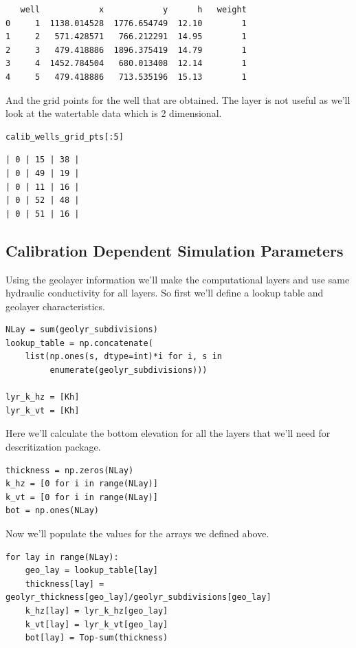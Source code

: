 \documentclass[titlepage,12pt]{unisubmission}
\begin{document}
\begin{verbatim}
   well            x            y      h   weight
0     1  1138.014528  1776.654749  12.10        1
1     2   571.428571   766.212291  14.95        1
2     3   479.418886  1896.375419  14.79        1
3     4  1452.784504   680.013408  12.14        1
4     5   479.418886   713.535196  15.13        1
\end{verbatim}

And the grid points for the well that are obtained. The layer is not useful as we'll look at the watertable data which is 2 dimensional.

\begin{verbatim}
calib_wells_grid_pts[:5]
\end{verbatim}

\begin{verbatim}
| 0 | 15 | 38 |
| 0 | 49 | 19 |
| 0 | 11 | 16 |
| 0 | 52 | 48 |
| 0 | 51 | 16 |
\end{verbatim}

\subsection{Calibration Dependent Simulation Parameters}
\label{sec:orgb977cb2}
Using the geolayer information we'll make the computational layers and use same hydraulic conductivity for all layers. So first we'll define a lookup table and geolayer characteristics.

\begin{verbatim}
NLay = sum(geolyr_subdivisions)
lookup_table = np.concatenate(
    list(np.ones(s, dtype=int)*i for i, s in
         enumerate(geolyr_subdivisions)))

lyr_k_hz = [Kh]
lyr_k_vt = [Kh]
\end{verbatim}

Here we'll calculate the bottom elevation for all the layers that we'll need for descritization package.

\begin{verbatim}
thickness = np.zeros(NLay)
k_hz = [0 for i in range(NLay)]
k_vt = [0 for i in range(NLay)]
bot = np.ones(NLay)
\end{verbatim}

Now we'll populate the values for the arrays we defined above.

\begin{verbatim}
for lay in range(NLay):
    geo_lay = lookup_table[lay]
    thickness[lay] = geolyr_thickness[geo_lay]/geolyr_subdivisions[geo_lay]
    k_hz[lay] = lyr_k_hz[geo_lay]
    k_vt[lay] = lyr_k_vt[geo_lay]
    bot[lay] = Top-sum(thickness)
\end{verbatim}
\end{document}
